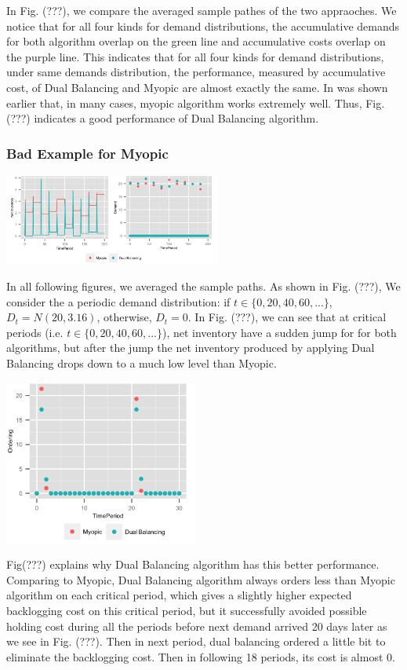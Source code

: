 \documentclass[twoside]{article}
\begin{document}
\begin{multicols}{2}
In Fig. (???), we compare the averaged sample pathes of the two appraoches. We notice that for all four kinds for demand distributions, the accumulative demands for both algorithm overlap on the green line and accumulative costs overlap on the purple line. This indicates that for all four kinds for demand distributions, under same demands distribution, the performance, measured by accumulative cost, of Dual Balancing and Myopic are almost exactly the same. In was shown earlier\cite{CLAcha1} that, in many cases, myopic algorithm works extremely well. Thus, Fig. (???) indicates a good performance of Dual Balancing algorithm.


 \subsubsection{Bad Example for Myopic} 
 \begin{center}
  \includegraphics[width=2.8in]{figures/MyopicBad.png}
\end{center}
  In all following figures, we averaged the sample paths. As shown in Fig. (???), We consider the a periodic demand distribution: if $t\in \{0,20,40,60,...\}$, $D_t=N(20,3.16)$, otherwise, $D_t=0$.  In Fig. (???), we can see that at critical periods (i.e. $t\in \{0,20,40,60,...\}$), net inventory have a sudden jump for for both algorithms, but after the jump the net inventory produced by applying Dual Balancing drops down to a much low level than Myopic.
 \begin{center}
  \includegraphics[width=2.5in]{figures/MyopicBadOrderingWriteup.png}
  \end{center}
  Fig(???) explains why Dual Balancing algorithm has this better performance. Comparing to Myopic, Dual Balancing algorithm always orders less than Myopic algorithm on each critical period, which gives a slightly higher expected backlogging cost on this critical period, but it successfully avoided possible holding cost during all the periods before next demand arrived 20 days later as we see in Fig. (???). Then in next period, dual balancing ordered a little bit to eliminate the backlogging cost. Then in following 18 periods, its cost is almost 0.


\end{multicols}
\end{document}
